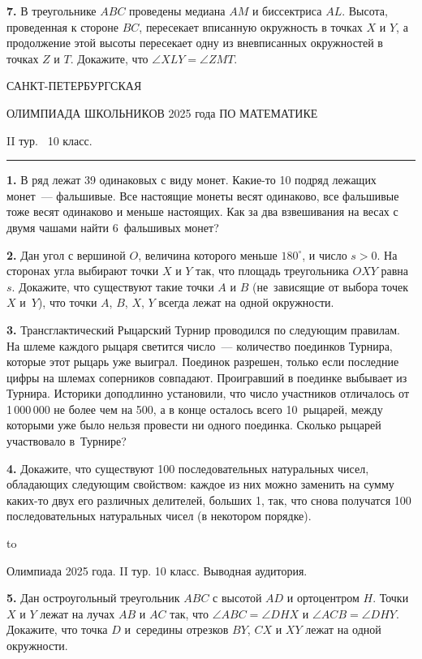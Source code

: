 \documentclass[12pt]{article}
\def\q#1.{{\bf #1. }}
\def\dotline{\smallskip\hbox to \hsize{\dotfill}\medskip}
\begin{document}
\q7. В треугольнике $ABC$ проведены медиана $AM$ и биссектриса $AL$. Высота, проведенная к стороне $BC$, пересекает вписанную окружность в точках $X$ и $Y$, а продолжение этой высоты пересекает одну из  вневписанных окружностей в точках $Z$ и $T$. Докажите, что $\angle XLY  = \angle ZMT$.


\clearpage

\centerline{\sc САНКТ-ПЕТЕРБУРГСКАЯ}
\centerline{\sc ОЛИМПИАДА ШКОЛЬНИКОВ 2025 года ПО МАТЕМАТИКЕ}
\centerline{\sc II тур. \ 10 класс.}
\medskip
\hrule
\medskip

\q1. В ряд лежат 39 одинаковых с виду монет. Какие-то 10 подряд лежащих
монет~--- фальшивые. Все настоящие монеты весят одинаково, все фальшивые
тоже весят одинаково и меньше настоящих. Как за два взвешивания на весах с
двумя чашами найти 6~фальшивых монет? 

\q2. Дан угол с вершиной $O$, величина которого меньше $180^\circ$, и число $s>0$. На сторонах угла выбирают точки $X$ и $Y$ так, что площадь треугольника $OXY$ равна~$s$. Докажите, что существуют такие точки 
$A$ и $B$ (не~зависящие от выбора точек $X$ и~$Y$), что точки $A$, $B$,
$X$, $Y$ всегда лежат на одной окружности. 

\q3. Трансглактический Рыцарский Турнир проводился по следующим правилам. На шлеме каждого рыцаря светится число~--- количество поединков Турнира, которые этот рыцарь уже выиграл. Поединок разрешен, только если последние цифры на шлемах соперников совпадают. Проигравший в поединке выбывает из Турнира. Историки доподлинно установили, что число участников отличалось от 1\,000\,000 не более чем на 500, а в конце осталось всего 10~рыцарей, между которыми уже было нельзя провести ни одного поединка. Сколько рыцарей участвовало в~Турнире?

\q4. Докажите, что существуют 100 последовательных натуральных чисел, обладающих следующим свойством: каждое из них можно заменить на сумму каких-то двух его различных делителей, больших 1, так, что снова получатся 100 последовательных натуральных чисел (в некотором порядке).

\dotline

\centerline{Олимпиада 2025 года. II тур. 10 класс. Выводная аудитория.}
\smallskip

\q5. Дан остроугольный треугольник $ABC$ с высотой $AD$ и ортоцентром $H$.
Точки $X$ и $Y$ лежат на лучах $AB$ и $AC$ так, что $\angle ABC = \angle
DHX$ и $\angle ACB = \angle DHY$. Докажите, что точка $D$ и~середины
отрезков $BY$, $CX$ и $XY$ лежат на одной окружности. 
\end{document}
